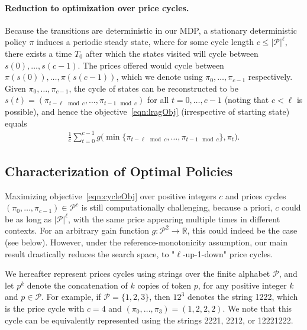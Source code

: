 \documentclass[format=acmsmall, review=false]{acmart}
\newcommand{\bR}{\mathbb{R}}
\newcommand{\cP}{\mathcal{P}}
\begin{document}
\paragraph{Reduction to optimization over price cycles.}
Because the transitions are deterministic in our MDP, a stationary deterministic policy $\pi$ induces a periodic steady state, where for some cycle length $c\le|\cP|^\ell$, there exists a time $T_0$ after which the states visited will cycle between $s(0),\ldots,s(c-1)$.
The prices offered would cycle between $\pi(s(0)),\ldots,\pi(s(c-1))$, which we denote using $\pi_0,\ldots,\pi_{c-1}$ respectively.
Given $\pi_0,\ldots,\pi_{c-1}$, the cycle of states can be reconstructed to be $s(t)=(\pi_{t-\ell\mod c},\ldots,\pi_{t-1\mod c})$ for all $t=0,\ldots,c-1$ (noting that $c<\ell$ is possible), and hence the objective~\eqref{eqn:lragObj} (irrespective of starting state) equals
\begin{align} \label{eqn:cycleObj}
\frac 1c \sum_{t=0}^{c-1} g\Big(\min\{\pi_{t-\ell\mod c},\ldots,\pi_{t-1\mod c}\},\pi_t\Big).
\end{align}

\subsection{Characterization of Optimal Policies}

Maximizing objective~\eqref{eqn:cycleObj} over positive integers $c$ and prices cycles $(\pi_0,\ldots,\pi_{c-1})\in\cP^c$ is still computationally challenging, because a priori, $c$ could be as long as $|\cP|^\ell$, with the same price appearing multiple times in different contexts.  For an arbitrary gain function $g:\cP^2\to\bR$, this could indeed be the case (see  below).  
However, under the reference-monotonicity assumption, our main result drastically reduces the search space, to "$\ell$-up-1-down" price cycles.

\begin{definition}[Notation]
We hereafter represent prices cycles using strings over the finite alphabet $\cP$, and let $p^k$ denote the concatenation of $k$ copies of  token $p$, for any positive integer $k$ and $p\in\cP$.
For example, if $\cP=\{1,2,3\}$, then $12^3$ denotes the string 1222, which is the price cycle with $c=4$ and $(\pi_0,\ldots,\pi_3)=(1,2,2,2)$.
We note that this cycle can be equivalently represented using the strings 2221, 2212, or 12221222.
\end{definition}
\end{document}
